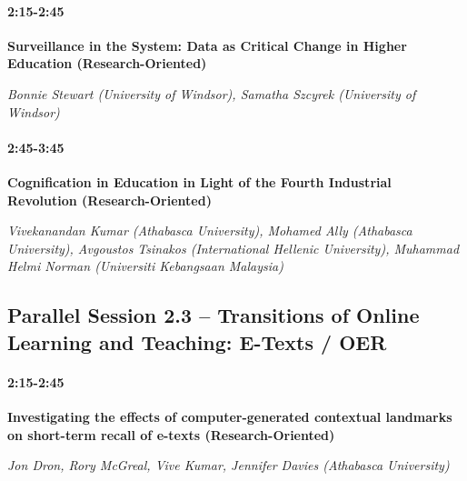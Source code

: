 \documentclass[
]{book}
\begin{document}
\begin{secondary}
\hypertarget{section}{%
\paragraph*{2:15-2:45}\label{section}}

\textbf{Surveillance in the System: Data as Critical Change in Higher
Education (Research-Oriented)}

\emph{Bonnie Stewart (University of Windsor), Samatha Szcyrek
(University of Windsor)}
\end{secondary}

\begin{secondary}
\hypertarget{section}{%
\paragraph*{2:45-3:45}\label{section}}

\textbf{Cognification in Education in Light of the Fourth Industrial
Revolution (Research-Oriented)}

\emph{Vivekanandan Kumar (Athabasca University), Mohamed Ally (Athabasca
University), Avgoustos Tsinakos (International Hellenic University),
Muhammad Helmi Norman (Universiti Kebangsaan Malaysia)}
\end{secondary}

\hypertarget{parallel-session-2.3-transitions-of-online-learning-and-teaching-e-texts-oer}{%
\subsection*{Parallel Session 2.3 -- Transitions of Online Learning and Teaching: E-Texts / OER}\label{parallel-session-2.3-transitions-of-online-learning-and-teaching-e-texts-oer}}

\begin{secondary}
\hypertarget{section}{%
\paragraph*{2:15-2:45}\label{section}}

\textbf{Investigating the effects of computer-generated contextual
landmarks on short-term recall of e-texts (Research-Oriented)}

\emph{Jon Dron, Rory McGreal, Vive Kumar, Jennifer Davies (Athabasca
University)}
\end{secondary}
\end{document}
